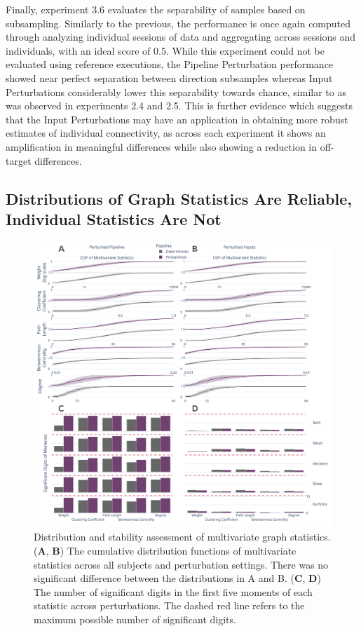 \documentclass[fleqn,10pt]{SelfArx} %
\begin{document}
Finally, experiment 3.6 evaluates the separability of samples based on subsampling. Similarly to the previous, the
performance is once again computed through analyzing individual sessions of data and aggregating across sessions and
individuals, with an ideal score of $0.5$. While this experiment could not be evaluated using reference executions, the
Pipeline Perturbation performance showed near perfect separation between direction subsamples whereas Input
Perturbations considerably lower this separability towards chance, similar to as was observed in experiments 2.4 and
2.5. This is further evidence which suggests that the Input Perturbations may have an application in obtaining more
robust estimates of individual connectivity, as across each experiment it shows an amplification in meaningful
differences while also showing a reduction in off-target differences.

\subsection*{Distributions of Graph Statistics Are Reliable, Individual Statistics Are Not}

\begin{figure}[bt!]\centering
\includegraphics[width=\linewidth]{figures/fig2_multivariate_differences.pdf}
\caption{Distribution and stability assessment of multivariate graph statistics. (\textbf{A}, \textbf{B}) The
cumulative distribution functions of multivariate statistics across all subjects and perturbation settings. There was
no significant difference between the distributions in A and B. (\textbf{C}, \textbf{D}) The number of significant
digits in the first five moments of each statistic across perturbations. The dashed red line refers to the maximum
possible number of significant digits.}
\label{fig:multivar}
\end{figure}
\end{document}
